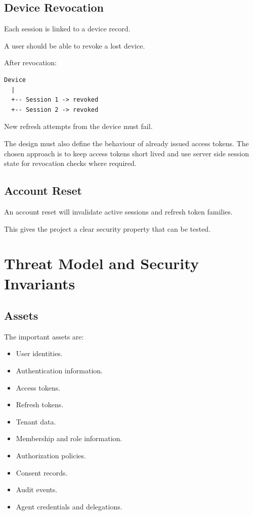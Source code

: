 \documentclass[11pt,a4paper]{article}
\begin{document}
\subsection{Device Revocation}

Each session is linked to a device record.

A user should be able to revoke a lost device.

After revocation:

\begin{verbatim}
Device
  |
  +-- Session 1 -> revoked
  +-- Session 2 -> revoked
\end{verbatim}

New refresh attempts from the device must fail.

The design must also define the behaviour of already issued access tokens. The chosen approach is to keep access tokens short lived and use server side session state for revocation checks where required.

\subsection{Account Reset}

An account reset will invalidate active sessions and refresh token families.

This gives the project a clear security property that can be tested.

\section{Threat Model and Security Invariants}

\subsection{Assets}

The important assets are:

\begin{itemize}
    \item User identities.
    \item Authentication information.
    \item Access tokens.
    \item Refresh tokens.
    \item Tenant data.
    \item Membership and role information.
    \item Authorization policies.
    \item Consent records.
    \item Audit events.
    \item Agent credentials and delegations.
\end{itemize}
\end{document}
